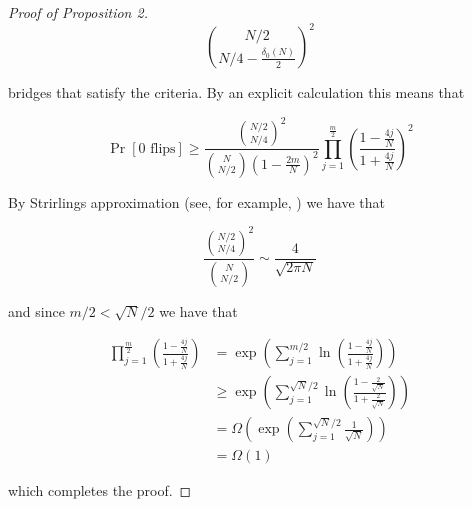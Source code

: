 \documentclass{article}
\theoremstyle{definition}
\begin{document}
\begin{proof}[Proof of Proposition 2]
$${N/2 \choose N/4-\frac{\delta_0(N)}{2}}^2$$

bridges that satisfy the criteria. By an explicit calculation this means that

\begin{equation*}
\Pr[0\,\,\mathrm{flips}]\geq \frac{{N/2 \choose N/4}^2}{{N \choose N/2}\left(1-\frac{2m}{N}\right)^{2}} \prod_{j=1}^{\frac{m}{2}}\left(\frac{1-\frac{4j}{N}}{1+\frac{4j}{N}}\right)^{2}
\end{equation*}

By Strirlings approximation (see, for example, \cite{eger2014stirling}) we have that

$$\frac{{N/2 \choose N/4}^2}{{N \choose N/2}}\sim \frac{4}{\sqrt{2\pi N}}$$

and since $m/2<\sqrt{N}/2$ we have that

\begin{align*}
\prod_{j=1}^{\frac{m}{2}}\left(\frac{1-\frac{4j}{N}}{1+\frac{4j}{N}}\right)&=\exp\left(\sum_{j=1}^{m/2}\ln\left(\frac{1-\frac{4j}{N}}{1+\frac{4j}{N}}\right)\right)\\
&\geq \exp\left(\sum_{j=1}^{\sqrt{N}/2}\ln\left(\frac{1-\frac{2}{\sqrt{N}}}{1+\frac{2}{\sqrt{N}}}\right)\right)\\
&=\Omega\left( \exp\left(\sum_{j=1}^{\sqrt{N}/2}\frac{1}{\sqrt{N}}\right)\right)\\
&=\Omega(1)
\end{align*}


which completes the proof.
\end{proof}




\end{document}
